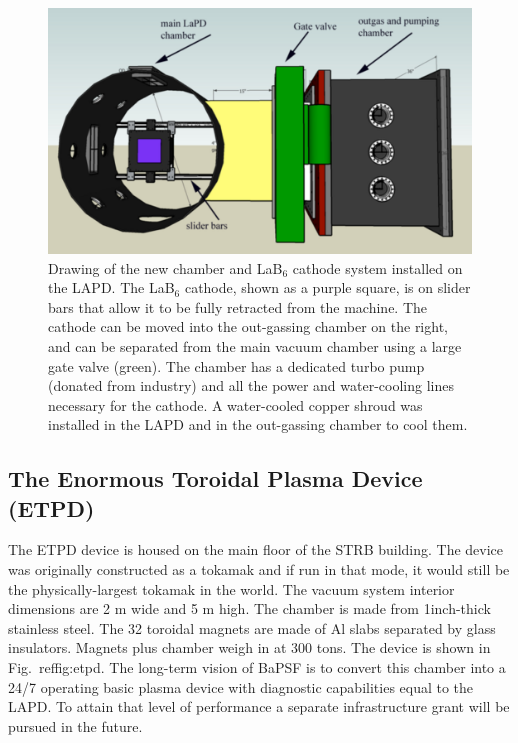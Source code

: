\documentclass[11pt]{article}
\begin{document}
\begin{figure}[htbp] %
   \centering
   \includegraphics[width=6in]{lab6cartoon.jpg} 
   \caption{Drawing of the new chamber and LaB$_{6}$ cathode system installed on the LAPD.  The LaB$_{6}$ cathode, shown as a purple square, is on slider bars that allow it to be fully retracted from the machine.  The cathode can be moved into the out-gassing chamber on the right, and can be separated from the main vacuum chamber using a large gate valve (green).  The chamber has a dedicated turbo pump (donated from industry) and all the power and water-cooling lines necessary for the cathode.  A water-cooled copper shroud was installed in the LAPD and in the out-gassing chamber to cool them.}
   \label{fig:lab6cartoon}
\end{figure}
		
		


\subsection{The Enormous Toroidal Plasma Device (ETPD)}
The ETPD device is housed on the main floor of the STRB building.  The device was originally constructed as a tokamak and if run in that mode, it would still be the physically-largest tokamak in the world.  The vacuum system interior dimensions are 2 m wide and 5 m high.  The chamber is made from 1inch-thick stainless steel.  The 32 toroidal magnets are made of Al slabs separated by glass insulators.  Magnets plus chamber weigh in at 300 tons. The device is shown in Fig.\ ref{fig:etpd}.   The long-term vision of BaPSF is to convert this chamber into a 24/7 operating basic plasma device with diagnostic capabilities equal to the LAPD. To attain that level of performance a separate infrastructure grant will be pursued in the future. 
\end{document}
